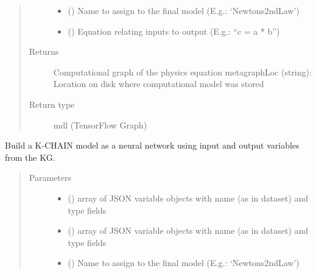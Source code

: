 \documentclass[letterpaper,10pt,english]{sphinxmanual}
\begin{document}
\begin{fulllineitems}
\begin{fulllineitems}
\begin{quote}
\begin{description}
\begin{itemize}
\item {} 
 () \textendash{} Name to assign to the final model (E.g.: ‘Newtons2ndLaw’)

\item {} 
 () \textendash{} Equation relating inputs to output (E.g.: “c = a * b”)

\end{itemize}

\item[{Returns}] \leavevmode
Computational graph of the physics equation
metagraphLoc (string): Location on disk where computational model was stored

\item[{Return type}] \leavevmode
mdl (TensorFlow Graph)

\end{description}\end{quote}

\end{fulllineitems}


\begin{fulllineitems}
\label{\detokenize{index:kChain.kChainModel._createNNModel}}
Build a K-CHAIN model as a neural network using input and output
variables from the KG.
\begin{quote}\begin{description}
\item[{Parameters}] \leavevmode\begin{itemize}
\item {} 
 () \textendash{} array of JSON variable objects with name (as in dataset) and type fields

\item {} 
 () \textendash{} array of JSON variable objects with name (as in dataset) and type fields

\item {} 
 () \textendash{} Name to assign to the final model (E.g.: ‘Newtons2ndLaw’)


\end{itemize}
\end{description}
\end{quote}
\end{fulllineitems}
\end{fulllineitems}
\end{document}
